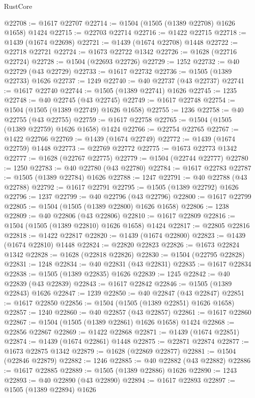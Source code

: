 \begin{lexlean}{RustCore}
\begin{coremodule}
@22708 := @1617 @22707
@22714 := @1504 (@1505 (@1389 @22708) @1626 @1658) @1424
@22715 := @22703 @22714
@22716 := @1422 @22715
@22718 := @1439 (@1674 @22698)
@22721 := @1439 (@1674 @22708) @1448
@22722 := @22718 @22721
@22724 := @1673 @22722 @1342
@22726 := @1628 (@22716 @22724)
@22728 := @1504 (@22693 @22726)
@22729 := 1252
@22732 := @40 @22729 (@43 @22729)
@22733 := @1617 @22732
@22736 := @1505 (@1389 @22733) @1626
@22737 := 1249
@22740 := @40 @22737 (@43 @22737)
@22741 := @1617 @22740
@22744 := @1505 (@1389 @22741) @1626
@22745 := 1235
@22748 := @40 @22745 (@43 @22745)
@22749 := @1617 @22748
@22754 := @1504 (@1505 (@1389 @22749) @1626 @1658)
@22755 := 1236
@22758 := @40 @22755 (@43 @22755)
@22759 := @1617 @22758
@22765 := @1504 (@1505 (@1389 @22759) @1626 @1658) @1424
@22766 := @22754 @22765
@22767 := @1422 @22766
@22769 := @1439 (@1674 @22749)
@22772 := @1439 (@1674 @22759) @1448
@22773 := @22769 @22772
@22775 := @1673 @22773 @1342
@22777 := @1628 (@22767 @22775)
@22779 := @1504 (@22744 @22777)
@22780 := 1250
@22783 := @40 @22780 (@43 @22780)
@22784 := @1617 @22783
@22787 := @1505 (@1389 @22784) @1626
@22788 := 1247
@22791 := @40 @22788 (@43 @22788)
@22792 := @1617 @22791
@22795 := @1505 (@1389 @22792) @1626
@22796 := 1237
@22799 := @40 @22796 (@43 @22796)
@22800 := @1617 @22799
@22805 := @1504 (@1505 (@1389 @22800) @1626 @1658)
@22806 := 1238
@22809 := @40 @22806 (@43 @22806)
@22810 := @1617 @22809
@22816 := @1504 (@1505 (@1389 @22810) @1626 @1658) @1424
@22817 := @22805 @22816
@22818 := @1422 @22817
@22820 := @1439 (@1674 @22800)
@22823 := @1439 (@1674 @22810) @1448
@22824 := @22820 @22823
@22826 := @1673 @22824 @1342
@22828 := @1628 (@22818 @22826)
@22830 := @1504 (@22795 @22828)
@22831 := 1248
@22834 := @40 @22831 (@43 @22831)
@22835 := @1617 @22834
@22838 := @1505 (@1389 @22835) @1626
@22839 := 1245
@22842 := @40 @22839 (@43 @22839)
@22843 := @1617 @22842
@22846 := @1505 (@1389 @22843) @1626
@22847 := 1239
@22850 := @40 @22847 (@43 @22847)
@22851 := @1617 @22850
@22856 := @1504 (@1505 (@1389 @22851) @1626 @1658)
@22857 := 1240
@22860 := @40 @22857 (@43 @22857)
@22861 := @1617 @22860
@22867 := @1504 (@1505 (@1389 @22861) @1626 @1658) @1424
@22868 := @22856 @22867
@22869 := @1422 @22868
@22871 := @1439 (@1674 @22851)
@22874 := @1439 (@1674 @22861) @1448
@22875 := @22871 @22874
@22877 := @1673 @22875 @1342
@22879 := @1628 (@22869 @22877)
@22881 := @1504 (@22846 @22879)
@22882 := 1246
@22885 := @40 @22882 (@43 @22882)
@22886 := @1617 @22885
@22889 := @1505 (@1389 @22886) @1626
@22890 := 1243
@22893 := @40 @22890 (@43 @22890)
@22894 := @1617 @22893
@22897 := @1505 (@1389 @22894) @1626

\end{coremodule}
\end{lexlean}
